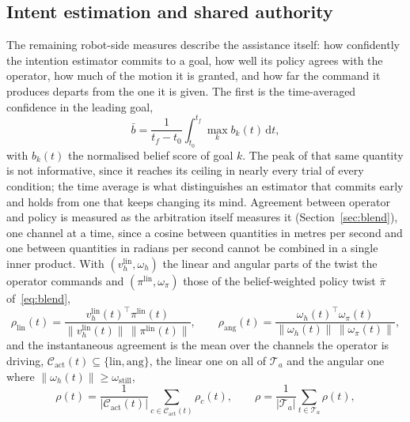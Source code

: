 \subsection{Intent estimation and shared authority}
\label{sec:resauthority}

The remaining robot-side measures describe the assistance itself: how confidently the intention estimator commits to a goal, how well its policy agrees with the operator, how much of the motion it is granted, and how far the command it produces departs from the one it is given. The first is the time-averaged confidence in the leading goal,
\begin{equation}
\bar{b} = \frac{1}{t_f-t_0} \int_{t_0}^{t_f} \max_k b_k(t) \, \mathrm{d}t,
\label{eq:mb}
\end{equation}
with $b_k(t)$ the normalised belief score of goal $k$. The peak of that same quantity is not informative, since it reaches its ceiling in nearly every trial of every condition; the time average is what distinguishes an estimator that commits early and holds from one that keeps changing its mind. Agreement between operator and policy is measured as the arbitration itself measures it (Section~\ref{sec:blend}), one channel at a time, since a cosine between quantities in metres per second and one between quantities in radians per second cannot be combined in a single inner product. With $(v_h^{\mathrm{lin}}, \omega_h)$ the linear and angular parts of the twist the operator commands and $(\pi^{\mathrm{lin}}, \omega_\pi)$ those of the belief-weighted policy twist $\bar{\pi}$ of~\eqref{eq:blend},
\begin{equation}
\rho_{\mathrm{lin}}(t) = \frac{v_h^{\mathrm{lin}}(t)^{\top} \pi^{\mathrm{lin}}(t)}{\lVert v_h^{\mathrm{lin}}(t)\rVert \, \lVert \pi^{\mathrm{lin}}(t)\rVert}, \qquad
\rho_{\mathrm{ang}}(t) = \frac{\omega_h(t)^{\top} \omega_\pi(t)}{\lVert \omega_h(t)\rVert \, \lVert \omega_\pi(t)\rVert},
\label{eq:mrhoc}
\end{equation}
and the instantaneous agreement is the mean over the channels the operator is driving, $\mathcal{C}_{\mathrm{act}}(t) \subseteq \{\mathrm{lin}, \mathrm{ang}\}$, the linear one on all of $\mathcal{T}_a$ and the angular one where $\lVert \omega_h(t) \rVert \ge \omega_{\text{still}}$,
\begin{equation}
\rho(t) = \frac{1}{|\mathcal{C}_{\mathrm{act}}(t)|} \sum_{c \in \mathcal{C}_{\mathrm{act}}(t)} \rho_c(t), \qquad
\rho = \frac{1}{|\mathcal{T}_a|} \sum_{t \in \mathcal{T}_a} \rho(t),
\label{eq:mrho}
\end{equation}
